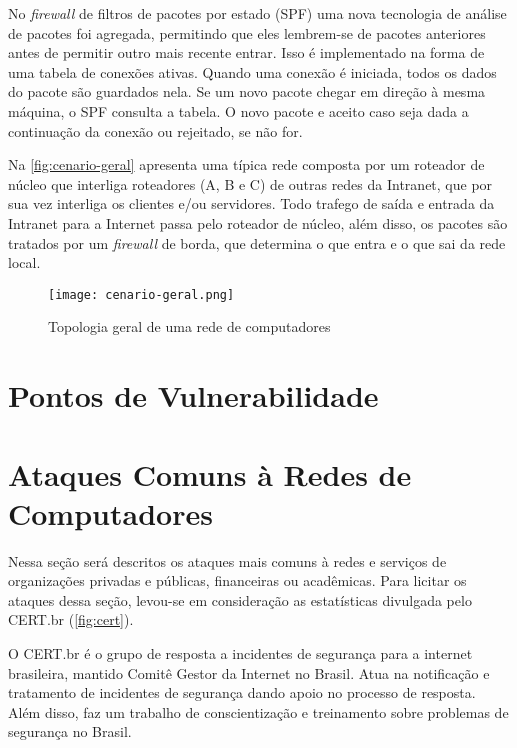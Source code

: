 No \textit{firewall} de filtros de pacotes por estado (SPF) uma nova tecnologia de análise de pacotes foi agregada, permitindo que eles lembrem-se de pacotes anteriores antes de permitir outro mais recente entrar. Isso é implementado na forma de uma tabela de conexões ativas. Quando uma conexão é iniciada, todos os dados do pacote são guardados nela. Se um novo pacote chegar em direção à mesma máquina, o SPF consulta a tabela. O novo pacote e aceito caso seja dada a continuação da conexão ou rejeitado, se não for.

Na \autoref{fig:cenario-geral} apresenta uma típica rede composta por um roteador de núcleo que interliga roteadores (A, B e C) de outras redes da Intranet, que por sua vez interliga os clientes e/ou servidores. Todo trafego de saída e entrada da Intranet para a Internet passa pelo roteador de núcleo, além disso, os pacotes são tratados por um \textit{firewall} de borda, que determina o que entra e o que sai da rede local.

\begin{figure}[htb]
    \centering
    \caption{Topologia geral de uma rede de computadores} 
    \texttt{[image: cenario-geral.png]}
    \label{fig:cenario-geral}
\end{figure}

\section{Pontos de Vulnerabilidade} \label{sec:pontos-vulnerabilidade}

\section{Ataques Comuns à Redes de Computadores} \label{sec:ataques-comuns}

Nessa seção será descritos os ataques mais comuns à redes e serviços de organizações privadas e públicas, financeiras ou acadêmicas. Para licitar os ataques dessa seção, levou-se em consideração as estatísticas divulgada pelo CERT.br (\autoref{fig:cert}).

O CERT.br é o grupo de resposta a incidentes de segurança para a internet brasileira, mantido Comitê Gestor da Internet no Brasil. Atua na notificação e tratamento de incidentes de segurança dando apoio no processo de resposta. Além disso, faz um trabalho de conscientização e treinamento sobre problemas de segurança no Brasil. 

